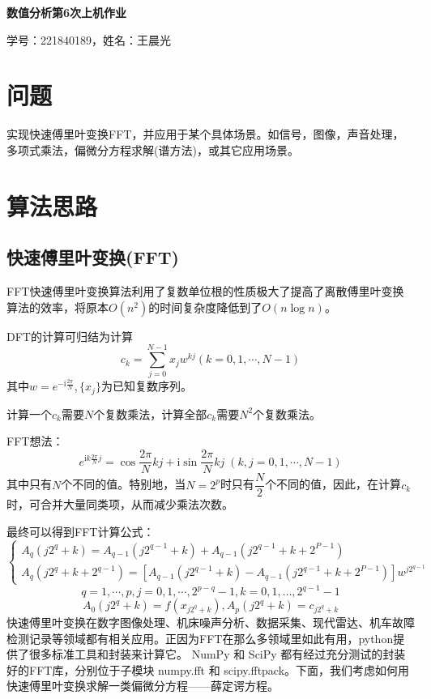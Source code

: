 \documentclass[UTF8,ctexart,a4paper,11pt,openany]{article}
\theoremstyle{definition}
\begin{document}
\begin{center}
{\huge \textbf{数值分析第6次上机作业}}

{\large 学号：221840189，姓名：王晨光}
\end{center}

\section{问题}
实现快速傅里叶变换FFT，并应用于某个具体场景。如信号，图像，声音处理，多项式乘法，偏微分方程求解(谱方法)，或其它应用场景。
\section{算法思路}
\subsection{快速傅里叶变换(FFT)}
FFT快速傅里叶变换算法利用了复数单位根的性质极大了提高了离散傅里叶变换算法的效率，将原本$O(n^2)$的时间复杂度降低到了$O(n\log{n})$。\\
\par DFT的计算可归结为计算
\[
    c_k=\sum_{j=0}^{N-1}x_j w^{k j} (k=0,1,\cdots,N-1)
\]
其中$w=e^{-\mathrm{i}\frac{2\pi}{N}}$,\,$\{x_j\}$为已知复数序列。\\
\par 计算一个$c_k$需要$N$个复数乘法，计算全部$c_k$需要$N^2$个复数乘法。\\
\par FFT想法：
\[
    e^{\mathrm{i} k \frac{2\pi}{N}j}=\cos{\dfrac{2\pi}{N}k j}+\mathrm{i}\sin{\dfrac{2\pi}{N}k j}\; (k,j=0,1,\cdots,N-1)
\]
其中只有$N$个不同的值。特别地，当$N=2^p$时只有$\dfrac{N}{2}$个不同的值，因此，在计算$c_k$时，可合并大量同类项，从而减少乘法次数。\par
最终可以得到FFT计算公式：$$\left\{\begin{array}{l}
    A_{q}\left(j 2^{q}+k\right)=A_{q-1}\left(j 2^{q-1}+k\right)+A_{q-1}\left(j 2^{q-1}+k+2^{P-1}\right) \\
    A_{q}\left(j 2^{q}+k+2^{q-1}\right)=\left[A_{q-1}\left(j 2^{q-1}+k\right)-A_{q-1}\left(j 2^{q-1}+k+2^{P-1}\right)\right] w^{j 2^{q-1}}
    \end{array}\right.$$
    $$ q=1, \cdots, p, j=0,1, \cdots, 2^{p-q}-1, k=0,1, \ldots, 2^{q-1}-1$$ 
    $$ A_0(j2^q+k)=f(x_{j2^q+k}),A_p(j2^q+k)=c_{j2^q+k}$$
\indent 快速傅里叶变换在数字图像处理、机床噪声分析、数据采集、现代雷达、机车故障检测记录等领域都有相关应用。正因为FFT在那么多领域里如此有用，python提供了很多标准工具和封装来计算它。 NumPy 和 SciPy 都有经过充分测试的封装好的FFT库，分别位于子模块 numpy.fft 和 scipy.fftpack。下面，我们考虑如何用快速傅里叶变换求解一类偏微分方程——薛定谔方程。\par
\end{document}
